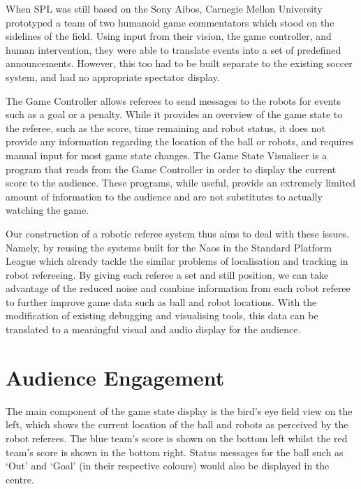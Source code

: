 \documentclass[runningheads,a4paper]{llncs}
\begin{document}
When SPL was still based on the Sony Aibos, Carnegie Mellon University prototyped a team of two humanoid game commentators which stood on the sidelines of the field.\cite{veloso2008}
Using input from their vision, the game controller, and human intervention, they were able to translate events into a set of predefined announcements.
However, this too had to be built separate to the existing soccer system, and had no appropriate spectator display.

The Game Controller allows referees to send messages to the robots for events such as a goal or a penalty.
While it provides an overview of the game state to the referee, such as the score, time remaining and robot status, it does not provide any information regarding the location of the ball or robots, and requires manual input for most game state changes.
The Game State Visualiser is a program that reads from the Game Controller in order to display the current score to the audience.
These programs, while useful, provide an extremely limited amount of information to the audience and are not substitutes to actually watching the game.

Our construction of a robotic referee system thus aims to deal with these issues. Namely, by reusing the systems built for the Naos in the Standard Platform League which already tackle the similar problems of localisation and tracking in robot refereeing. By giving each referee a set and still position, we can take advantage of the reduced noise and combine information from each robot referee to further improve game data such as ball and robot locations. With the modification of existing debugging and visualising tools, this data can be translated to a meaningful visual and audio display for the audience.

\section{Audience Engagement}

The main component of the game state display is the bird's eye field view on the left, which shows the current location of the ball and robots as perceived by the robot referees.
The blue team's score is shown on the bottom left whilst the red team's score is shown in the bottom right.
Status messages for the ball such as `Out' and `Goal' (in their respective colours) would also be displayed in the centre.
\end{document}
